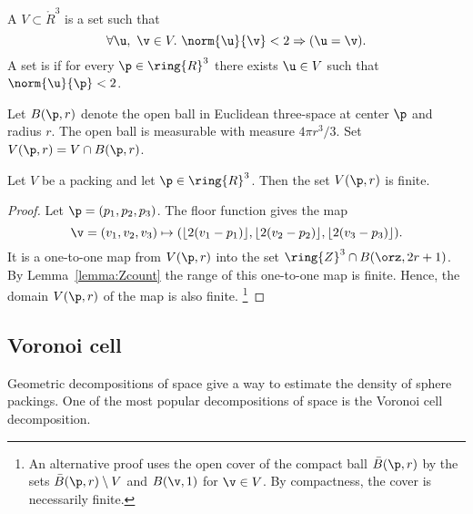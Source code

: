 \begin{definition} 
A  $ V\subset \ring{R}^3$ is a set such that
\[ 
\forall  \u,~\v\in  V.~  \norm{ \u}{\v} < 2 \Rightarrow ( \u=\v).
\]  
A set is  if for every $\p\in\ring{R}^3$ there
exists $ \u\in V$ such that $\norm{ \u}{\p}< 2$.
\end{definition}
%
%



Let $B(\p,r)$ denote the open ball in
Euclidean three-space at center $\p$ and radius $r$.  The open ball
is measurable with measure $4\pi r^3/3$.
 Set $ V(\p,r) = V \cap
B(\p,r)$. %
%
%

\begin{lemma}[]
\label{lemma:V-finite}
Let $ V$ be a packing and let $\p\in\ring{R}^3$.
Then the set $ V(\p,r)$ is finite.
\end{lemma}

\begin{proof}  Let $\p = (p_1,p_2,p_3)$. The floor function gives the map
\[ \v=(v_1,v_2,v_3)\mapsto (\lfloor 2(v_1-p_1)
  \rfloor, \lfloor 2(v_2-p_2) \rfloor, \lfloor 2(v_3-p_3) \rfloor).
\] 
It is a one-to-one map from $ V(\p,r)$ into the set $\ring{Z}^3\cap
B(\orz,2r + 1)$.  By Lemma~\ref{lemma:Zcount} the range of this
one-to-one map is finite.  Hence, the domain $ V(\p,r)$ of the map is
also finite.%
\footnote{An alternative proof uses the open cover of the compact ball
  $\bar B(\p,r)$ by the sets $\bar B(\p,r)\setminus V$ and $B(\v,1)$
  for $\v\in V$. By compactness, the cover is necessarily finite.}
\end{proof}
%






\subsection{Voronoi cell}

Geometric decompositions of space give a way to estimate the density of sphere packings.
One of the most popular decompositions of space is the Voronoi cell decomposition.

